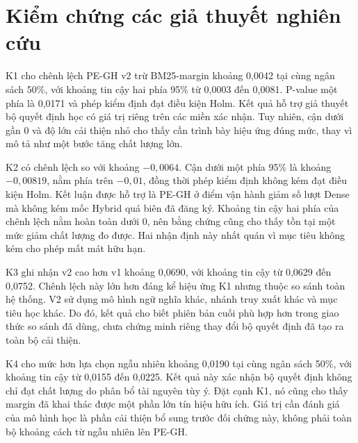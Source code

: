 \section{Kiểm chứng các giả thuyết nghiên cứu}
\begin{table}[htbp]
\centering\small
\caption{Kết quả K1 đến K4 trên sáu miền xác nhận. Cột khoảng tin cậy dùng hai phía để mô tả, còn quyết định kiểm định dùng p-value một phía và Holm theo giao thức.}
\label{tab:hypotheses}

\end{table}

K1 cho chênh lệch PE-GH v2 trừ BM25-margin khoảng 0,0042 tại cùng ngân sách 50\%, với khoảng tin cậy hai phía 95\% từ 0,0003 đến 0,0081. P-value một phía là 0,0171 và phép kiểm định đạt điều kiện Holm. Kết quả hỗ trợ giả thuyết bộ quyết định học có giá trị riêng trên các miền xác nhận. Tuy nhiên, cận dưới gần 0 và độ lớn cải thiện nhỏ cho thấy cần trình bày hiệu ứng đúng mức, thay vì mô tả như một bước tăng chất lượng lớn.

K2 có chênh lệch so với \Hstar{} khoảng $-0{,}0064$. Cận dưới một phía 95\% là khoảng $-0{,}00819$, nằm phía trên $-0{,}01$, đồng thời phép kiểm định không kém đạt điều kiện Holm. Kết luận được hỗ trợ là PE-GH ở điểm vận hành giảm số lượt Dense mà không kém mốc Hybrid quá biên đã đăng ký. Khoảng tin cậy hai phía của chênh lệch nằm hoàn toàn dưới 0, nên bằng chứng cũng cho thấy tồn tại một mức giảm chất lượng đo được. Hai nhận định này nhất quán vì mục tiêu không kém cho phép mất mát hữu hạn.

K3 ghi nhận v2 cao hơn v1 khoảng 0,0690, với khoảng tin cậy từ 0,0629 đến 0,0752. Chênh lệch này lớn hơn đáng kể hiệu ứng K1 nhưng thuộc so sánh toàn hệ thống. V2 sử dụng mô hình ngữ nghĩa khác, nhánh truy xuất khác và mục tiêu học khác. Do đó, kết quả cho biết phiên bản cuối phù hợp hơn trong giao thức so sánh đã dùng, chưa chứng minh riêng thay đổi bộ quyết định đã tạo ra toàn bộ cải thiện.

K4 cho mức hơn lựa chọn ngẫu nhiên khoảng 0,0190 tại cùng ngân sách 50\%, với khoảng tin cậy từ 0,0155 đến 0,0225. Kết quả này xác nhận bộ quyết định không chỉ đạt chất lượng do phân bổ tài nguyên tùy ý. Đặt cạnh K1, nó cũng cho thấy margin đã khai thác được một phần lớn tín hiệu hữu ích. Giá trị cần đánh giá của mô hình học là phần cải thiện bổ sung trước đối chứng này, không phải toàn bộ khoảng cách từ ngẫu nhiên lên PE-GH.

